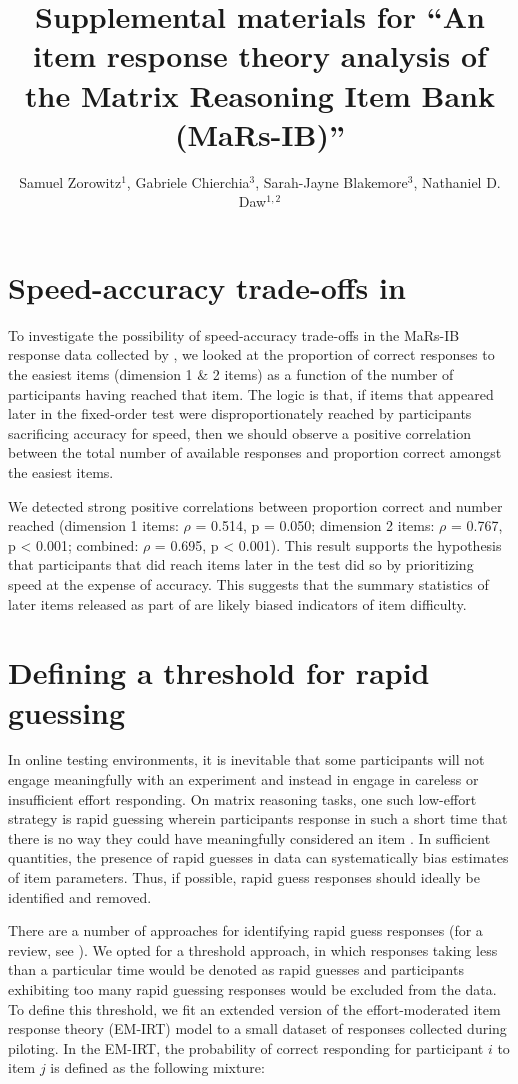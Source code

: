 \documentclass[a4paper,man,natbib]{apa6}
\title{Supplemental materials for ``An item response theory analysis of the Matrix Reasoning Item Bank (MaRs-IB)''}
\author{Samuel Zorowitz$^1$, Gabriele Chierchia$^3$, Sarah-Jayne Blakemore$^3$, Nathaniel D. Daw$^{1,2}$}
\affiliation{$^1$Princeton Neuroscience Institute, Princeton University, USA\\$^2$Department of Psychology, Princeton University, USA\\$^3$Department of Psychology, University of Cambridge, Downing Street, Cambridge, UK}
\begin{document}
\maketitle

\section*{Speed-accuracy trade-offs in \cite{chierchia2019matrix}}

To investigate the possibility of speed-accuracy trade-offs in the MaRs-IB response data collected by \cite{chierchia2019matrix}, we looked at the proportion of correct responses to the easiest items (dimension 1 \& 2 items) as a function of the number of participants having reached that item. The logic is that, if items that appeared later in the fixed-order test were disproportionately reached by participants sacrificing accuracy for speed, then we should observe a positive correlation between the total number of available responses and proportion correct amongst the easiest items. 

We detected strong positive correlations between proportion correct and number reached (dimension 1 items: $\rho$ = 0.514, p = 0.050; dimension 2 items: $\rho$ = 0.767, p < 0.001; combined: $\rho$ = 0.695, p < 0.001). This result supports the hypothesis that participants that did reach items later in the test did so by prioritizing speed at the expense of accuracy. This suggests that the summary statistics of later items released as part of \cite{chierchia2019matrix} are likely biased indicators of item difficulty.

\section{Defining a threshold for rapid guessing}

In online testing environments, it is inevitable that some participants will not engage meaningfully with an experiment and instead in engage in careless or insufficient effort responding. On matrix reasoning tasks, one such low-effort strategy is rapid guessing wherein participants response in such a short time that there is no way they could have meaningfully considered an item \citep{wise2017rapid}. In sufficient quantities, the presence of rapid guesses in data can systematically bias estimates of item parameters. Thus, if possible, rapid guess responses should ideally be identified and removed. 

There are a number of approaches for identifying rapid guess responses (for a review, see \cite{wise2017rapid}). We opted for a threshold approach, in which responses taking less than a particular time would be denoted as rapid guesses and participants exhibiting too many rapid guessing responses would be excluded from the data. To define this threshold, we fit an extended version of the effort-moderated item response theory (EM-IRT) model \citep{wise2006application} to a small dataset of responses collected during piloting. In the EM-IRT, the probability of correct responding for participant $i$ to item $j$ is defined as the following mixture:
\end{document}

